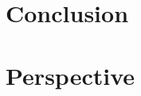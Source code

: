 
\section{Conclusion}\label{section:generalconclusion}
\section{Perspective}\label{section:perspectives}